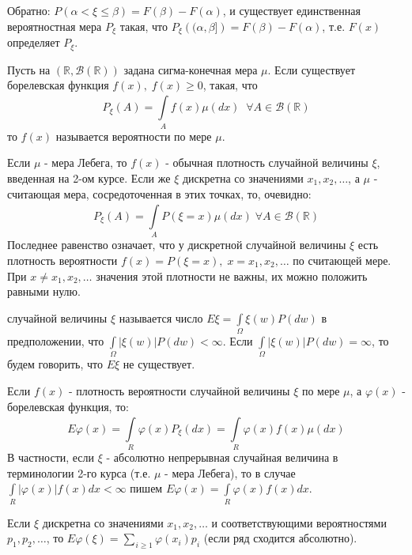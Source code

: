 Обратно: $P(\alpha < \xi \le \beta) = F(\beta) - F(\alpha)$, и существует единственная вероятностная мера $P_{\xi}$ такая, что $P_{\xi} \left( (\alpha, \beta] \right) = F(\beta) - F(\alpha)$, т.е. $F(x)$ определяет $P_{\xi}$.

\begin{definition}\label{cha:1/def:8}
	Пусть на $(\mathbb{R}, \mathcal{B}(\mathbb{R}))$ задана сигма-конечная мера $\mu$. Если существует борелевская функция $f(x), \; f(x) \ge 0$, такая, что
	$$P_{\xi} (A) = \underset{A}{\overset{}{\int}}f(x) \mu(dx) \;\; \forall A \in \mathcal{B}(\mathbb{R})$$
	то $f(x)$ называется  вероятности по мере $\mu$.
\end{definition}

Если $\mu$ - мера Лебега, то $f(x)$ - обычная плотность случайной величины $\xi$, введенная на 2-ом курсе. Если же $\xi$ дискретна со значениями $x_1, x_2, \dots$, а $\mu$ - считающая мера, сосредоточенная в этих точках, то, очевидно:
$$P_{\xi}(A) = \underset{A}{\overset{}{\int}}P(\xi = x)\mu(dx) \; \forall A \in \mathcal{B}(\mathbb{R})$$
Последнее равенство означает, что у дискретной случайной величины $\xi$ есть плотность вероятности $f(x) = P(\xi = x), \; x = x_1, x_2, \dots$ по считающей мере. При $x \not = x_1, x_2, \dots$ значения этой плотности не важны, их можно положить равными нулю.

\begin{definition}\label{cha:1/def:9}
	 случайной величины $\xi$ называется число $E \xi = \underset{\Omega}{\overset{}{\int}}\xi(w) P(dw)$ в предположении, что $\underset{\Omega}{\overset{}{\int}}|\xi(w)|P(dw) < \infty$. Если $\underset{\Omega}{\overset{}{\int}}|\xi(w)|P(dw) = \infty$, то будем говорить, что $E \xi$ не существует.
\end{definition}

Если $f(x)$ - плотность вероятности случайной величины $\xi$ по мере $\mu$, а $\varphi(x)$ - борелевская функция, то:
$$E \varphi(x) = \underset{R}{\overset{}{\int}}\varphi(x) P_{\xi} (dx) = \underset{R}{\overset{}{\int}}\varphi(x) f(x) \mu(dx)$$
В частности, если $\xi$ - абсолютно непрерывная случайная величина в терминологии 2-го курса (т.е. $\mu$ - мера Лебега), то в случае $\underset{R}{\overset{}{\int}}|\varphi(x)|f(x) dx < \infty$ пишем $E \varphi(x) = \underset{R}{\overset{}{\int}}\varphi(x) f(x) dx$.

Если $\xi$ дискретна со значениями $x_1, x_2, \dots$ и соответствующими вероятностями $p_1, p_2, \dots$, то $E \varphi (\xi) = \underset{i \ge 1}{\overset{}{\sum}} \varphi (x_i) p_i$ (если ряд сходится абсолютно).

